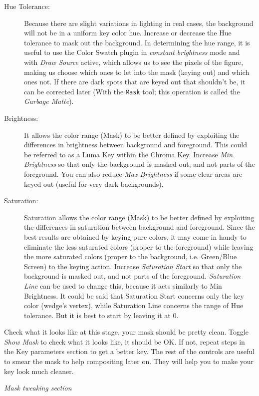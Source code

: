 \begin{description}
	\item[Hue Tolerance:] Because there are slight variations in lighting in real cases, the background will not be in a uniform key color hue. Increase or decrease the Hue tolerance to mask out the background.  In determining the hue range, it is useful to use the Color Swatch plugin in \textit{constant brightness} mode and with \textit{Draw Source} active, which allows us to see the pixels of the figure, making us choose which ones to let into the mask (keying out) and which ones not. If there are dark spots that are keyed out that shouldn’t be, it can be corrected later (With the \texttt{Mask} tool; this operation is called the \textit{Garbage Matte}).
	\item[Brightness:] It allows the color range (Mask) to be better defined by exploiting the differences in brightness between background and foreground. This could be referred to as a Luma Key within the Chroma Key. Increase \textit{Min Brightness} so that only the background is masked out, and not parts of the foreground. You can also reduce \textit{Max Brightness} if some clear areas are keyed out (useful for very dark backgrounds).
	\item[Saturation:] Saturation allows the color range (Mask) to be better defined by exploiting the differences in saturation between background and foreground. Since the best results are obtained by keying pure colors, it may come in handy to eliminate the less saturated colors (proper to the foreground) while leaving the more saturated colors (proper to the background, i.e. Green/Blue Screen) to the keying action. Increase \textit{Saturation Start} so that only the background is masked out, and not parts of the foreground. \textit{Saturation Line} can be used to change this, because it acts similarly to Min Brightness. It could be said that Saturation Start concerns only the key color (wedge's vertex), while Saturation Line concerns the range of Hue tolerance. But it is best to start by leaving it at $0$.
\end{description}

Check what it looks like at this stage, your mask should be pretty
clean. Toggle \textit{Show Mask} to check what it looks like, it
should be OK\@. If not, repeat steps in the Key parameters section to get a better
key. The rest of the controls are useful to smear the mask to help
compositing later on. They will help you to make your key look much
cleaner.

\qquad \textit{Mask tweaking section}

